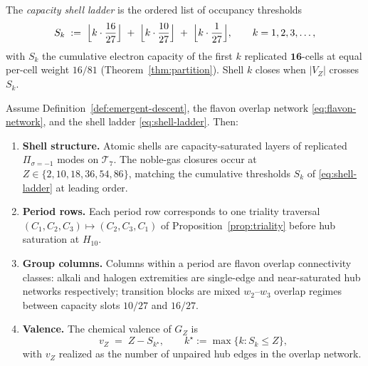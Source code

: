 \begin{definition}\label{def:capacity-shell}
The \emph{capacity shell ladder} is the ordered list of occupancy thresholds
\begin{equation}\label{eq:shell-ladder}
  S_k
  \;:=\;
  \Bigl\lfloor k\cdot\frac{16}{27}\Bigr\rfloor
  \;+\;
  \Bigl\lfloor k\cdot\frac{10}{27}\Bigr\rfloor
  \;+\;
  \Bigl\lfloor k\cdot\frac{1}{27}\Bigr\rfloor,
  \qquad k=1,2,3,\ldots,
\end{equation}
with $S_k$ the cumulative electron capacity of the first $k$ replicated
$\mathbf{16}$-cells at equal per-cell weight $16/81$
(Theorem~\ref{thm:partition}). Shell $k$ closes when $|V_Z|$ crosses $S_k$.
\end{definition}

\begin{theorem}
\label{thm:chemistry-ladder}
Assume Definition~\ref{def:emergent-descent}, the flavon overlap network
\eqref{eq:flavon-network}, and the shell ladder \eqref{eq:shell-ladder}.
Then:
\begin{enumerate}[label=(\roman*),leftmargin=*]
  \item \textbf{Shell structure.} Atomic shells are capacity-saturated layers
    of replicated $\Pi_{\sigma=-1}$ modes on $\mathcal{T}_7$. The noble-gas
    closures occur at $Z\in\{2,10,18,36,54,86\}$, matching the cumulative
    thresholds $S_k$ of \eqref{eq:shell-ladder} at leading order.
  \item \textbf{Period rows.} Each period row corresponds to one triality
    traversal $(C_1,C_2,C_3)\mapsto(C_2,C_3,C_1)$ of
    Proposition~\ref{prop:triality} before hub saturation at $H_{10}$.
  \item \textbf{Group columns.} Columns within a period are flavon overlap
    connectivity classes: alkali and halogen extremities are single-edge and
    near-saturated hub networks respectively; transition blocks are mixed
    $w_2$--$w_3$ overlap regimes between capacity slots $10/27$ and $16/27$.
  \item \textbf{Valence.} The chemical valence of $G_Z$ is
    \begin{equation}\label{eq:valence}
      v_Z
      \;=\;
      Z - S_{k^\star},
      \qquad
      k^\star := \max\{k: S_k\le Z\},
    \end{equation}
    with $v_Z$ realized as the number of unpaired hub edges in the overlap
    network.
\end{enumerate}
\end{theorem}

